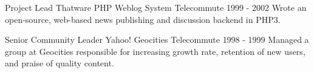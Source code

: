 \begin{cventries}

\cventry
{Project Lead}
{Thatware PHP Weblog System}
{Telecommute}
{1999 - 2002} %
{ %
Wrote an open-source, web-based news publishing and discussion backend in PHP3.
}


\cventry
{Senior Community Leader}
{Yahoo! Geocities}
{Telecommute}
{1998 - 1999} %
{ %
Managed a group at Geocities responsible for increasing growth rate, retention of new users, and praise of quality content.
}


\end{cventries}
